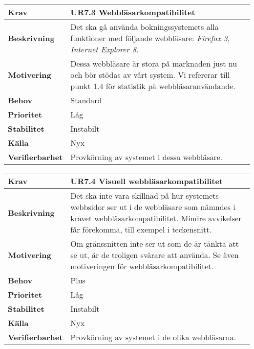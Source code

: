 \documentclass[a4paper, twoside, 11pt, titlepage]{article}
\begin{document}
		\begin {table} [ht] \begin{tabular} { p{2.6cm} p{12.5cm} }
			\hline
			{\sffamily\textbf{Krav}} & {\sffamily\textbf{UR7.3 Webbläsarkompatibilitet}} \\
			\hline
			{\sffamily\textbf{Beskrivning}} & {Det ska gå använda bokningssystemets alla funktioner med följande webbläsare: \emph{Firefox 3}, \emph{Internet Explorer 8}.} \\
			\hline
			{\sffamily\textbf{Motivering}} & {Dessa webbläsare är stora på marknaden just nu och bör stödas av vårt system. Vi refererar till punkt 1.4 för statistik på webbläsaranvändande.} \\
			\hline
			{\sffamily\textbf{Behov}} & {Standard} \\
			\hline
			{\sffamily\textbf{Prioritet}} & {Låg} \\
			\hline
			{\sffamily\textbf{Stabilitet}} & {Instabilt} \\
			\hline
			{\sffamily\textbf{Källa}} & {Nyx} \\
			\hline
			{\sffamily\textbf{Verifierbarhet}} & {Provkörning av systemet i dessa webbläsare.} \\
			\hline
		\end{tabular} \end{table} \FloatBarrier
		\vspace{6mm}

		\begin {table} [ht] \begin{tabular} { p{2.6cm} p{12.5cm} }
			\hline
			{\sffamily\textbf{Krav}} & {\sffamily\textbf{UR7.4 Visuell webbläsarkompatibilitet}} \\
			\hline
			{\sffamily\textbf{Beskrivning}} & {Det ska inte vara skillnad på hur systemets webbsidor ser ut i de webbläsare som nämndes i kravet webbläsarkompatibilitet. Mindre avvikelser får förekomma, till exempel i teckensnitt.} \\
			\hline
			{\sffamily\textbf{Motivering}} & {Om gränssnitten inte ser ut som de är tänkta att se ut, är de troligen svårare att använda. Se även motiveringen för webbläsarkompatibilitet.} \\
			\hline
			{\sffamily\textbf{Behov}} & {Plus} \\
			\hline
			{\sffamily\textbf{Prioritet}} & {Låg} \\
			\hline
			{\sffamily\textbf{Stabilitet}} & {Instabilt} \\
			\hline
			{\sffamily\textbf{Källa}} & {Nyx} \\
			\hline
			{\sffamily\textbf{Verifierbarhet}} & {Provkörning av systemet i de olika webbläsarna.} \\
			\hline
		\end{tabular} \end{table} \FloatBarrier
		\vspace{6mm}
\end{document}
